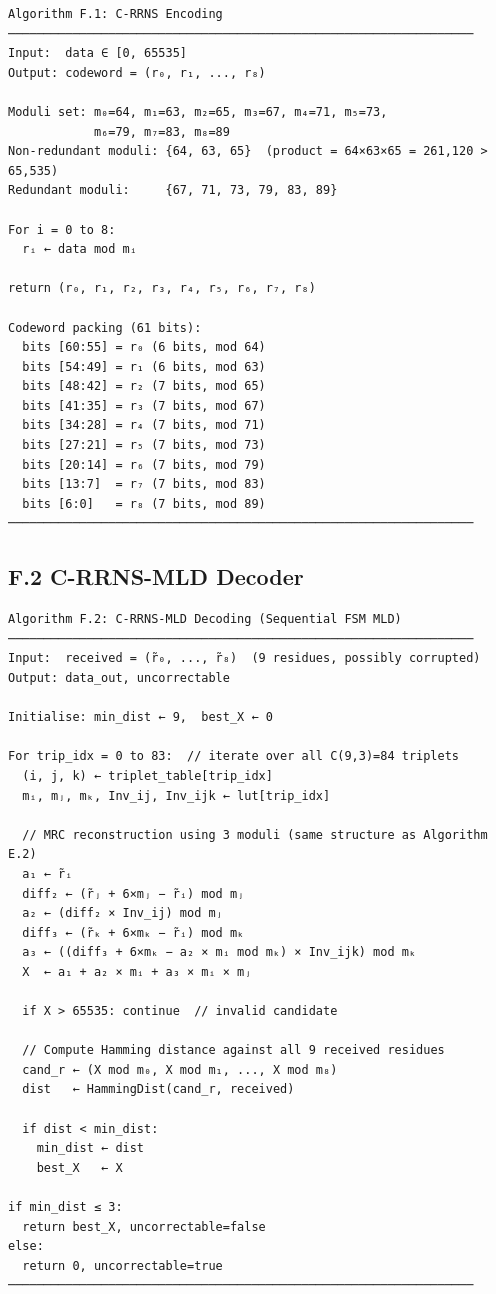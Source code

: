 \documentclass[
  english,
  12pt,
]{report}
\begin{document}
\begin{verbatim}
Algorithm F.1: C-RRNS Encoding
─────────────────────────────────────────────────────────────────
Input:  data ∈ [0, 65535]
Output: codeword = (r₀, r₁, ..., r₈)

Moduli set: m₀=64, m₁=63, m₂=65, m₃=67, m₄=71, m₅=73,
            m₆=79, m₇=83, m₈=89
Non-redundant moduli: {64, 63, 65}  (product = 64×63×65 = 261,120 > 65,535)
Redundant moduli:     {67, 71, 73, 79, 83, 89}

For i = 0 to 8:
  rᵢ ← data mod mᵢ

return (r₀, r₁, r₂, r₃, r₄, r₅, r₆, r₇, r₈)

Codeword packing (61 bits):
  bits [60:55] = r₀ (6 bits, mod 64)
  bits [54:49] = r₁ (6 bits, mod 63)
  bits [48:42] = r₂ (7 bits, mod 65)
  bits [41:35] = r₃ (7 bits, mod 67)
  bits [34:28] = r₄ (7 bits, mod 71)
  bits [27:21] = r₅ (7 bits, mod 73)
  bits [20:14] = r₆ (7 bits, mod 79)
  bits [13:7]  = r₇ (7 bits, mod 83)
  bits [6:0]   = r₈ (7 bits, mod 89)
─────────────────────────────────────────────────────────────────
\end{verbatim}

\subsection{F.2 C-RRNS-MLD Decoder}\label{f.2-c-rrns-mld-decoder}

\begin{verbatim}
Algorithm F.2: C-RRNS-MLD Decoding (Sequential FSM MLD)
─────────────────────────────────────────────────────────────────
Input:  received = (r̃₀, ..., r̃₈)  (9 residues, possibly corrupted)
Output: data_out, uncorrectable

Initialise: min_dist ← 9,  best_X ← 0

For trip_idx = 0 to 83:  // iterate over all C(9,3)=84 triplets
  (i, j, k) ← triplet_table[trip_idx]
  mᵢ, mⱼ, mₖ, Inv_ij, Inv_ijk ← lut[trip_idx]

  // MRC reconstruction using 3 moduli (same structure as Algorithm E.2)
  a₁ ← r̃ᵢ
  diff₂ ← (r̃ⱼ + 6×mⱼ − r̃ᵢ) mod mⱼ
  a₂ ← (diff₂ × Inv_ij) mod mⱼ
  diff₃ ← (r̃ₖ + 6×mₖ − r̃ᵢ) mod mₖ
  a₃ ← ((diff₃ + 6×mₖ − a₂ × mᵢ mod mₖ) × Inv_ijk) mod mₖ
  X  ← a₁ + a₂ × mᵢ + a₃ × mᵢ × mⱼ

  if X > 65535: continue  // invalid candidate

  // Compute Hamming distance against all 9 received residues
  cand_r ← (X mod m₀, X mod m₁, ..., X mod m₈)
  dist   ← HammingDist(cand_r, received)

  if dist < min_dist:
    min_dist ← dist
    best_X   ← X

if min_dist ≤ 3:
  return best_X, uncorrectable=false
else:
  return 0, uncorrectable=true
─────────────────────────────────────────────────────────────────
\end{verbatim}
\end{document}
